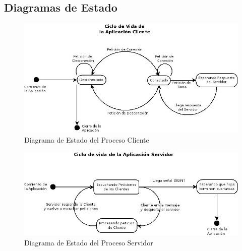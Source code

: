 \documentclass[a4paper,10pt]{article}
\begin{document}
		\subsection{Diagramas de Estado}
			\begin{figure}[!htpb]
				\centering
				\includegraphics[width=12cm]{DEstadoVidaCliente.jpeg}
				\caption{Diagrama de Estado del Proceso Cliente} \label{Img001}
			\end{figure}

			\begin{figure}[!htpb]
				\centering
				\includegraphics[width=12cm]{DEstadoVidaServidor.jpeg}
				\caption{Diagrama de Estado del Proceso Servidor} \label{Img002}
			\end{figure}

		\newpage
\end{document}
